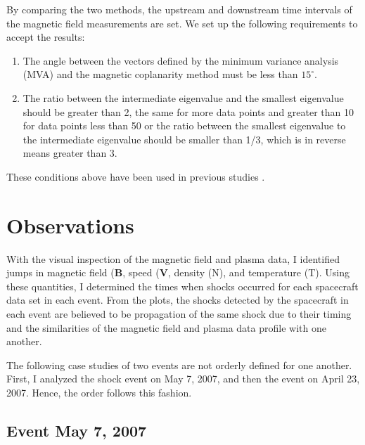 \documentclass[draft]{agujournal2019}
\begin{document}
By comparing the two methods, the upstream and downstream time intervals of the magnetic field measurements are set. We set up the following requirements to accept the results:
\begin{enumerate}
 \item The angle between the vectors defined by the minimum variance analysis (MVA) and the magnetic coplanarity method must be less than  $15^{\circ}$.
 \item The ratio between the intermediate eigenvalue and the smallest eigenvalue should be greater than 2, the same for more data points and greater than 10 for data points less than 50 or the ratio between the smallest eigenvalue to the intermediate eigenvalue should be smaller than 1/3, which is in reverse means greater than 3. 
 \end{enumerate}
 These conditions above have been used in previous studies \cite{facsko08:_clust,facsko09:_clust,facsko10:_study_clust,shan13:_compar_mva_venus,sonnerup67:_magnet_struc_attit_explor_obser}.


 \section{Observations}
\label{sec:obs}
 
With the visual inspection of the magnetic field and plasma data, I identified jumps in magnetic field ($\mathbf{B}$, speed ($\mathbf{V}$, density (N), and temperature (T). Using these quantities, I determined the times when shocks occurred for each spacecraft data set in each event. From the plots, the shocks detected by the spacecraft in each event are believed to be propagation of the same shock due to their timing and the similarities of the magnetic field and plasma data profile with one another.

The following case studies of two events are not orderly defined for one another. First, I analyzed the shock event on May 7, 2007, and then the event on April 23, 2007. Hence, the order follows this fashion.

\subsection{Event May 7, 2007}
\label{sec:event20070507}
\end{document}
